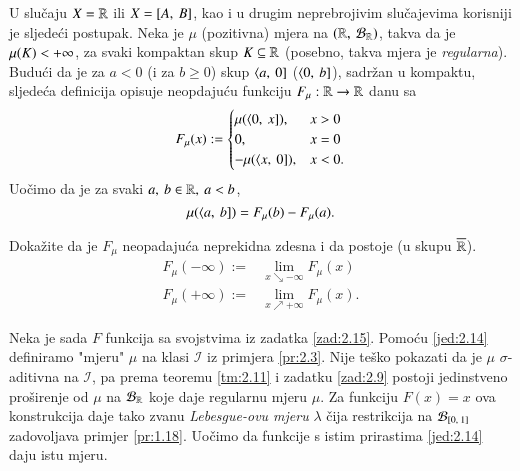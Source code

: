 U slu\v caju $X = \mathbb{R}$ ili $X = [{A}, \:{B}]$, kao i u drugim
neprebrojivim slu\v cajevima korisniji je sljede\' ci postupak.
Neka je $\mu$ (pozitivna) mjera na $(\mathbb{R}, \: \mathcal{B}_{\mathbb{R}})$, takva da je
$\mu({K}) < +\infty$, za svaki kompaktan skup $K \subseteq \mathbb{R}$
(posebno, takva mjera je \emph{regularna}). Budu\' ci da je za
$a < 0$ (i za $b \geq 0$) skup $\langle {a}, \: {0}]$ ($\langle {0}, \: {b}]$),
sadr\v zan u kompaktu, sljede\' ca definicija opisuje neopdaju\' cu
funkciju $F_{\mu}: \mathbb{R} \to \mathbb{R}$ danu sa
\begin{equation}    \label{jed:2.13}
    F_{\mu}(x) :=
        \begin{cases}
            \mu({\langle {0}, \: {x}]}), &x > 0\\
            0,   &x = 0\\
            - \mu({\langle {x}, \: {0}]}), &x < 0.
        \end{cases}
\end{equation}
Uo\v cimo da je za svaki $a, \: b \in \mathbb{R}, \: a < b$,
\begin{equation}    \label{jed:2.14}
    \mu({\langle {a}, \: {b}]}) = F_{\mu}(b) - F_{\mu}(a).
\end{equation}

\begin{zad} \label{zad:2.15}
    Doka\v zite da je $F_{\mu}$ neopadaju\' ca neprekidna zdesna i da
    postoje (u skupu $\overline{\mathbb{R}}$).
    \begin{align*}
        F_{\mu}(-\infty) :=& \lim_{x \searrow -\infty} F_{\mu}(x)\\
        F_{\mu}(+\infty) :=& \lim_{x \nearrow +\infty} F_{\mu}(x).
    \end{align*}
\end{zad}

Neka je sada $F$ funkcija sa svojstvima iz zadatka \ref{zad:2.15}.
Pomo\' cu \eqref{jed:2.14} definiramo "mjeru" $\mu$ na klasi
$\mathcal{I}$ iz primjera \eqref{pr:2.3}. Nije te\v sko pokazati
da je $\mu$ $\sigma$-aditivna na $\mathcal{I}$, pa prema teoremu
\ref{tm:2.11} i zadatku \ref{zad:2.9} postoji jedinstveno
pro\v sirenje od $\mu$ na $\mathcal{B}_{\mathbb{R}}$ koje daje regularnu mjeru
$\mu$. Za funkciju $F(x) = x$ ova konstrukcija daje tako zvanu
\emph{Lebesgue-ovu mjeru} $\lambda$ \v cija restrikcija na
$\mathcal{B}_{[{0}, \:{1}]}$ zadovoljava primjer \ref{pr:1.18}.
Uo\v cimo da funkcije s istim prirastima \eqref{jed:2.14}
daju istu mjeru.


